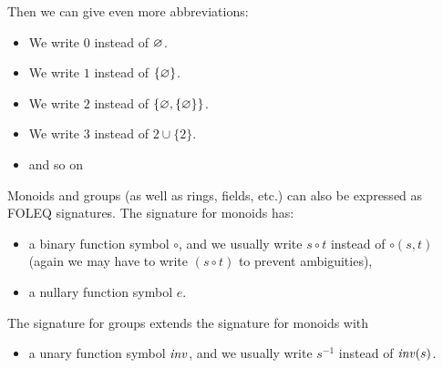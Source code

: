 \begin{example}
Then we can give even more abbreviations:
\begin{itemize}
\item We write $0$ instead of $\varnothing$.
\item We write $1$ instead of $\{\varnothing\}$.
\item We write $2$ instead of $\{\varnothing,\{\varnothing\}\}$.
\item We write $3$ instead of $2\cup\{2\}$.
\item and so on
\end{itemize}
\end{example}

\begin{example}
Monoids and groups (as well as rings, fields, etc.) can also be expressed as FOLEQ signatures.
The signature for monoids has:
\begin{itemize}
\item a binary function symbol $\circ$, and we usually write $s\circ t$ instead of $\circ(s,t)$ (again we may have to write $(s\circ t)$ to prevent ambiguities),
\item a nullary function symbol $e$.
\end{itemize}
The signature for groups extends the signature for monoids with
\begin{itemize}
\item a unary function symbol $\mathit{inv}$, and we usually write $s^{-1}$ instead of $\mathit{inv}(s)$.
\end{itemize}
\end{example}


